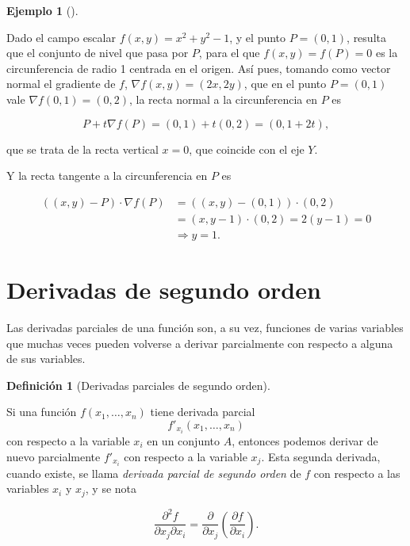 \documentclass[
  a4paper,
]{scrreport}
\theoremstyle{definition}
\newtheorem{definition}{Definición}[chapter]
\theoremstyle{plain}
\theoremstyle{plain}
\theoremstyle{definition}
\theoremstyle{definition}
\newtheorem{example}{Ejemplo}[chapter]
\theoremstyle{plain}
\theoremstyle{remark}
\begin{document}
\begin{example}[]\protect\hypertarget{exm-tangente-normal-funcion-implicita-plano}{}\label{exm-tangente-normal-funcion-implicita-plano}

Dado el campo escalar \(f(x,y)=x^2+y^2-1\), y el punto \(P=(0,1)\),
resulta que el conjunto de nivel que pasa por \(P\), para el que
\(f(x,y)=f(P)=0\) es la circunferencia de radio 1 centrada en el origen.
Así pues, tomando como vector normal el gradiente de \(f\),
\(\nabla f(x,y) = (2x,2y)\), que en el punto \(P=(0,1)\) vale
\(\nabla f(0,1) = (0,2)\), la recta normal a la circunferencia en \(P\)
es

\[
P + t \nabla f(P) = (0,1) + t (0,2) = (0, 1+2t),
\]

que se trata de la recta vertical \(x=0\), que coincide con el eje
\(Y\).

Y la recta tangente a la circunferencia en \(P\) es

\begin{align*}
((x,y)-P)\cdot \nabla f(P) 
&= ((x,y)-(0,1))\cdot (0,2) \\
&= (x, y-1)\cdot(0, 2) 
= 2(y-1) 
= 0 \\
&\Rightarrow y=1.
\end{align*}

\end{example}

\hypertarget{derivadas-de-segundo-orden}{%
\section{Derivadas de segundo orden}\label{derivadas-de-segundo-orden}}

Las derivadas parciales de una función son, a su vez, funciones de
varias variables que muchas veces pueden volverse a derivar parcialmente
con respecto a alguna de sus variables.

\begin{definition}[Derivadas parciales de segundo
orden]\protect\hypertarget{def-derivadas-segundo-orden}{}\label{def-derivadas-segundo-orden}

Si una función \(f(x_1,\ldots,x_n)\) tiene derivada parcial
\[f'_{x_i}(x_1,\ldots,x_n)\] con respecto a la variable \(x_i\) en un
conjunto \(A\), entonces podemos derivar de nuevo parcialmente
\(f'_{x_i}\) con respecto a la variable \(x_j\). Esta segunda derivada,
cuando existe, se llama \emph{derivada parcial de segundo orden} de
\(f\) con respecto a las variables \(x_i\) y \(x_j\), y se nota

\[\frac{\partial ^2 f}{\partial x_j \partial x_i}= \frac{\partial}{\partial x_j}\left(\frac{\partial f}{\partial x_i}\right).\]

\end{definition}
\end{document}
